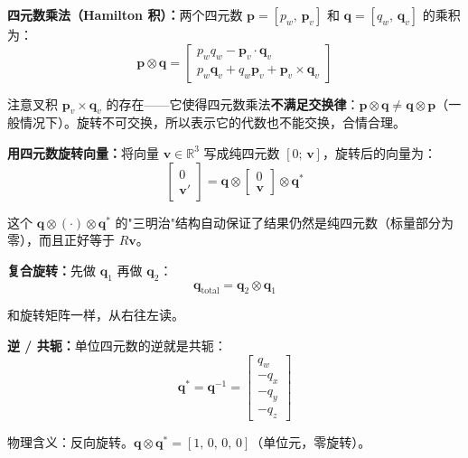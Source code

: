 \textbf{四元数乘法（Hamilton 积）：}两个四元数 $\mathbf{p} = [p_w,\, \mathbf{p}_v]$ 和 $\mathbf{q} = [q_w,\, \mathbf{q}_v]$ 的乘积为：
\begin{equation}
\mathbf{p} \otimes \mathbf{q} = \begin{bmatrix} p_w q_w - \mathbf{p}_v \cdot \mathbf{q}_v \\ p_w \mathbf{q}_v + q_w \mathbf{p}_v + \mathbf{p}_v \times \mathbf{q}_v \end{bmatrix}
\end{equation}

注意叉积 $\mathbf{p}_v \times \mathbf{q}_v$ 的存在——它使得四元数乘法\textbf{不满足交换律}：$\mathbf{p} \otimes \mathbf{q} \neq \mathbf{q} \otimes \mathbf{p}$（一般情况下）。旋转不可交换，所以表示它的代数也不能交换，合情合理。

\textbf{用四元数旋转向量：}将向量 $\mathbf{v} \in \mathbb{R}^3$ 写成纯四元数 $[0;\, \mathbf{v}]$，旋转后的向量为：
\begin{equation}
\begin{bmatrix} 0 \\ \mathbf{v}' \end{bmatrix} = \mathbf{q} \otimes \begin{bmatrix} 0 \\ \mathbf{v} \end{bmatrix} \otimes \mathbf{q}^*
\end{equation}

这个 $\mathbf{q} \otimes (\cdot) \otimes \mathbf{q}^*$ 的"三明治"结构自动保证了结果仍然是纯四元数（标量部分为零），而且正好等于 $R\mathbf{v}$。

\textbf{复合旋转：}先做 $\mathbf{q}_1$ 再做 $\mathbf{q}_2$：
\begin{equation}
\mathbf{q}_{\text{total}} = \mathbf{q}_2 \otimes \mathbf{q}_1
\end{equation}

和旋转矩阵一样，从右往左读。

\textbf{逆 / 共轭：}单位四元数的逆就是共轭：
\begin{equation}
\mathbf{q}^* = \mathbf{q}^{-1} = \begin{bmatrix} q_w \\ -q_x \\ -q_y \\ -q_z \end{bmatrix}
\end{equation}

物理含义：反向旋转。$\mathbf{q} \otimes \mathbf{q}^* = [1,\, 0,\, 0,\, 0]$（单位元，零旋转）。

